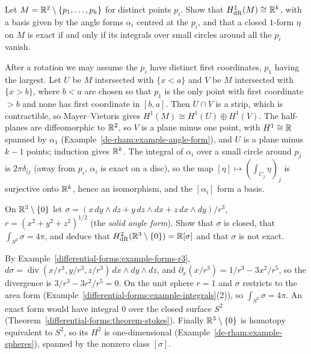 \begin{exercise}\label{de-rham:exercise-punctured-plane}
Let $M = \mathbb{R}^2 \setminus \{p_1, \ldots, p_k\}$ for distinct points $p_i$. Show that $H^1_{\mathrm{dR}}(M) \cong \mathbb{R}^k$, with a basis given by the angle forms $\alpha_i$ centred at the $p_i$,
and that a closed $1$-form $\eta$ on $M$ is exact if and only if its integrals over small circles around all the $p_i$ vanish.
\end{exercise}

\begin{solution}
After a rotation we may assume the $p_i$ have distinct first coordinates, $p_1$ having the largest. Let $U$ be $M$ intersected with $\{x < a\}$ and $V$ be $M$ intersected with
$\{x > b\}$, where $b < a$ are chosen so that $p_1$ is the only point with first coordinate $> b$ and none has first coordinate in $[b, a]$. Then $U \cap V$ is a strip, which is
contractible, so Mayer--Vietoris gives $H^1(M) \cong H^1(U) \oplus H^1(V)$. The half-planes are diffeomorphic to $\mathbb{R}^2$, so $V$ is a plane minus one point, with $H^1 \cong \mathbb{R}$ spanned by
$\alpha_1$ (Example~\ref{de-rham:example-angle-form}), and $U$ is a plane minus $k - 1$ points; induction gives $\mathbb{R}^k$. The integral of $\alpha_i$ over a small circle around $p_j$ is
$2\pi\delta_{ij}$ (away from $p_i$, $\alpha_i$ is exact on a disc), so the map $[\eta] \mapsto (\int_{C_j}\eta)_j$ is surjective onto $\mathbb{R}^k$, hence an isomorphism, and the $[\alpha_i]$ form a basis.
\end{solution}

\begin{exercise}\label{de-rham:exercise-solid-angle}
On $\mathbb{R}^3 \setminus \{0\}$ let $\sigma = (x\,dy \wedge dz + y\,dz \wedge dx + z\,dx \wedge dy)/r^3$, $r = (x^2 + y^2 + z^2)^{1/2}$ (the \emph{solid angle form}). Show that $\sigma$ is closed, that
$\int_{S^2}\sigma = 4\pi$, and deduce that $H^2_{\mathrm{dR}}(\mathbb{R}^3 \setminus \{0\}) = \mathbb{R}[\sigma]$ and that $\sigma$ is not exact.
\end{exercise}

\begin{solution}
By Example~\ref{differential-forms:example-forms-r3}, $d\sigma = \operatorname{div}(x/r^3, y/r^3, z/r^3)\,dx \wedge dy \wedge dz$, and $\partial_x(x/r^3) = 1/r^3 - 3x^2/r^5$, so the divergence is
$3/r^3 - 3r^2/r^5 = 0$. On the unit sphere $r = 1$ and $\sigma$ restricts to the area form (Example~\ref{differential-forms:example-integrals}(2)), so $\int_{S^2}\sigma = 4\pi$. An exact form would have
integral $0$ over the closed surface $S^2$ (Theorem~\ref{differential-forms:theorem-stokes}). Finally $\mathbb{R}^3 \setminus \{0\}$ is homotopy equivalent to $S^2$, so its $H^2$ is one-dimensional
(Example~\ref{de-rham:example-spheres}), spanned by the nonzero class $[\sigma]$.
\end{solution}

